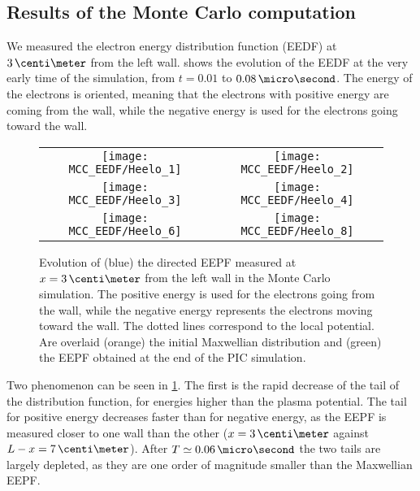   \subsection{Results of the Monte Carlo computation} \label{subsec-MCMresults}
    We measured the electron energy distribution function (EEDF) at $3\,\centi\meter$ from the left wall.
     shows the evolution of the EEDF at the very early time of the simulation, from $t=0.01$ to $0.08\,\micro\second$.
    The energy of the electrons is oriented, meaning that the electrons with positive energy are coming from the wall, while the negative energy is used for the electrons going toward the wall.

    \begin{figure}[!hbt]
      \centering
      \begin{tabular}{@{} cc}
        \texttt{[image: MCC\_EEDF/Heelo\_1]} &
        \texttt{[image: MCC\_EEDF/Heelo\_2]} \\
        \texttt{[image: MCC\_EEDF/Heelo\_3]} &
        \texttt{[image: MCC\_EEDF/Heelo\_4]} \\
        \texttt{[image: MCC\_EEDF/Heelo\_6]} &
        \texttt{[image: MCC\_EEDF/Heelo\_8]} \\
      \end{tabular}
      \caption{Evolution of (blue) the directed EEPF measured at $x=3\,\centi\meter$ from the left wall in the Monte Carlo simulation. The positive energy is used for the electrons going from the wall, while the negative energy represents the electrons moving toward the wall. The dotted lines correspond to the local potential. Are overlaid (orange) the initial Maxwellian distribution and (green) the EEPF obtained at the end of the \acs{PIC} simulation. }
      \label{fig-zoom_init_Mc}
    \end{figure}
    

    Two phenomenon can be seen in \cref{fig-zoom_init_Mc}.
    The first is the rapid decrease of the tail of the distribution function, for energies higher than the plasma potential.
    The tail for positive energy decreases faster than for negative energy, as the EEPF is measured closer to one wall than the other ($x=3\,\centi\meter$ against $L-x=7\,\centi\meter$).
    After $ T \simeq 0.06\,\micro\second$ the two tails are largely depleted, as they are one order of magnitude smaller than the Maxwellian EEPF.

